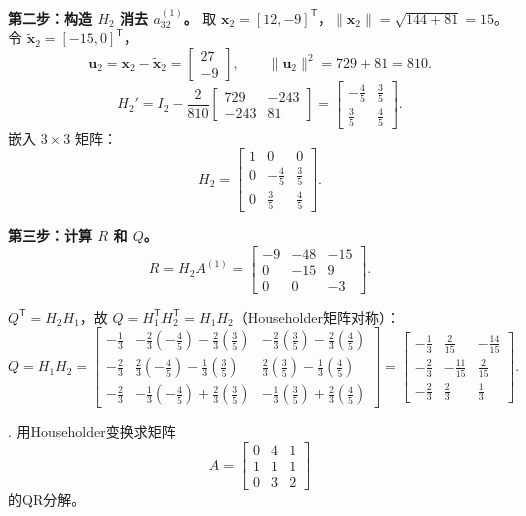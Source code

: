 \documentclass{article}
\begin{document}
\textbf{第二步：构造 $H_2$ 消去 $a_{32}^{(1)}$。}
取 $\bm{x}_2=[12,-9]^{\mathsf T}$，$\|\bm{x}_2\|=\sqrt{144+81}=15$。
令 $\widetilde{\bm{x}}_2=[-15,0]^{\mathsf T}$，
\[
\bm{u}_2 = \bm{x}_2 - \widetilde{\bm{x}}_2 = \begin{bmatrix}27\\-9\end{bmatrix},\qquad
\|\bm{u}_2\|^2 = 729+81 = 810.
\]
\[
H_2' = I_2 - \frac{2}{810}\begin{bmatrix}729 & -243\\-243 & 81\end{bmatrix}
= \begin{bmatrix}-\frac45 & \frac35\\[4pt]\frac35 & \frac45\end{bmatrix}.
\]
嵌入 $3\times3$ 矩阵：
\[
H_2 = \begin{bmatrix}
1 & 0 & 0\\
0 & -\frac45 & \frac35\\[4pt]
0 & \frac35 & \frac45
\end{bmatrix}.
\]

\textbf{第三步：计算 $R$ 和 $Q$。}
\[
R = H_2 A^{(1)} = \begin{bmatrix}
-9 & -48 & -15\\
0 & -15 & 9\\
0 & 0 & -3
\end{bmatrix}.
\]

$Q^{\mathsf T}=H_2H_1$，故 $Q=H_1^{\mathsf T}H_2^{\mathsf T}=H_1H_2$（Householder矩阵对称）：
\[
Q = H_1H_2 = \begin{bmatrix}
-\frac13 & -\frac{2}{3}(-\frac45)-\frac{2}{3}(\frac35) & -\frac{2}{3}(\frac35)-\frac{2}{3}(\frac45)\\[4pt]
-\frac23 & \frac{2}{3}(-\frac45)-\frac{1}{3}(\frac35) & \frac{2}{3}(\frac35)-\frac{1}{3}(\frac45)\\[4pt]
-\frac23 & -\frac{1}{3}(-\frac45)+\frac{2}{3}(\frac35) & -\frac{1}{3}(\frac35)+\frac{2}{3}(\frac45)
\end{bmatrix}
= \begin{bmatrix}
-\frac13 & \frac{2}{15} & -\frac{14}{15}\\[4pt]
-\frac23 & -\frac{11}{15} & \frac{2}{15}\\[4pt]
-\frac23 & \frac{2}{3} & \frac{1}{3}
\end{bmatrix}.
\]
\newpage

. 用Householder变换求矩阵
\[
A=\begin{bmatrix}
0 & 4 & 1 \\
1 & 1 & 1 \\
0 & 3 & 2
\end{bmatrix}
\]
的QR分解。
\end{document}
